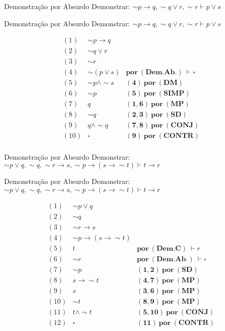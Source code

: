 \begin{frame}[t]{Demonstração por Absurdo}
	Demonstrar: $\sim p \rightarrow q, \sim q \vee r, \sim r \vdash p \vee s$
\end{frame}


\begin{frame}[t]{Demonstração por Absurdo}
	Demonstrar: $\sim p \rightarrow q, \sim q \vee r, \sim r \vdash p \vee s$
	
	\vskip 0.5cm
	
	$$\begin{array}{lll}
	(1) & \sim p \rightarrow q & \\
	(2) & \sim q \vee r & \\
	(3) & \sim r & \\
	(4) & \sim (p \vee s) & \mathbf{por~(Dem.Ab.)~}\vdash\square \\
	\hline
	(5) & \sim p \wedge\sim s & \mathbf{(4)~por~(DM)} \\
	(6) & \sim p & \mathbf{(5)~por~(SIMP)} \\
	(7) & q & \mathbf{(1,6)~por~(MP)} \\
	(8) & \sim q & \mathbf{(2,3)~por~(SD)} \\
	(9) & q \wedge \sim q & \mathbf{(7,8)~por~(CONJ)} \\
	(10) & \square & \mathbf{(9)~por~(CONTR)} \\
	\end{array}$$	
\end{frame}


\begin{frame}[t]{Demonstração por Absurdo}
	Demonstrar: $\sim p \vee q, \sim q, \sim r \rightarrow s, \sim p \rightarrow (s \rightarrow\sim t) \vdash t \rightarrow r$
\end{frame}

\begin{frame}[t]{Demonstração por Absurdo}
	Demonstrar: $\sim p \vee q, \sim q, \sim r \rightarrow s, \sim p \rightarrow (s \rightarrow\sim t) \vdash t \rightarrow r$
	
	\vskip 0.5cm
	
	$$\begin{array}{lll}
	(1) & \sim p \vee q & \\
	(2) & \sim q & \\
	(3) & \sim r \rightarrow s & \\
	(4) & \sim p \rightarrow (s \rightarrow\sim t) & \\
	(5) & t & \mathbf{por~(Dem.C)~}\vdash r \\
	(6) & \sim r & \mathbf{por~(Dem.Ab.)~}\vdash \square \\
	\hline
	(7) & \sim p & \mathbf{(1,2)~por~(SD)} \\
	(8) & s \rightarrow\sim t & \mathbf{(4,7)~por~(MP)} \\
	(9) & s & \mathbf{(3,6)~por~(MP)} \\
	(10) & \sim t & \mathbf{(8,9)~por~(MP)} \\
	(11) & t \wedge\sim t & \mathbf{(5,10)~por~(CONJ)} \\
	(12) & \square & \mathbf{(11)~por~(CONTR)} \\
	\end{array}$$	
\end{frame}

